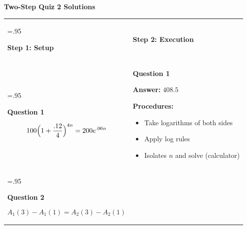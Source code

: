 \documentclass[11pt]{article}
\begin{document}
\begin{center}
{\Large \textbf{Two-Step Quiz 2 Solutions}}
\end{center}

\vspace{8pt}

\begin{tabularx}{\linewidth}{>{\hsize=.95\hsize}X >{\hsize=1.05\hsize}X}

\begin{tcolorbox}[colback=HeaderGray]
\centering \textbf{Step 1: Setup}
\end{tcolorbox}
&
\begin{tcolorbox}[colback=HeaderGray]
\centering \textbf{Step 2: Execution}
\end{tcolorbox}
\\

\begin{tcolorbox}[height=5cm,valign=top]
\textbf{Question 1}

\vspace{1cm}

\[
100\Bigl(1+\frac{.12}{4}\Bigr)^{4n}
=
200e^{.06n}
\]
\end{tcolorbox}
&
\begin{tcolorbox}[height=5cm,valign=top]
\textbf{Question 1}

\begin{center}
\textbf{Answer:} $408.5$
\end{center}

\textbf{Procedures:}
\begin{itemize}
    \item Take logarithms of both sides
    \item Apply log rules  
    \item Isolates $n$ and solve (calculator)
\end{itemize}
\end{tcolorbox}
\\[6pt]


\begin{tcolorbox}[height=5cm,valign=top]
\textbf{Question 2}

\vspace{.5cm}

\[
A_1(3) - A_1(1) = A_2(3)-A_2(1)
\]


\vspace{.5cm}



\end{tcolorbox}
\end{tabularx}
\end{document}
